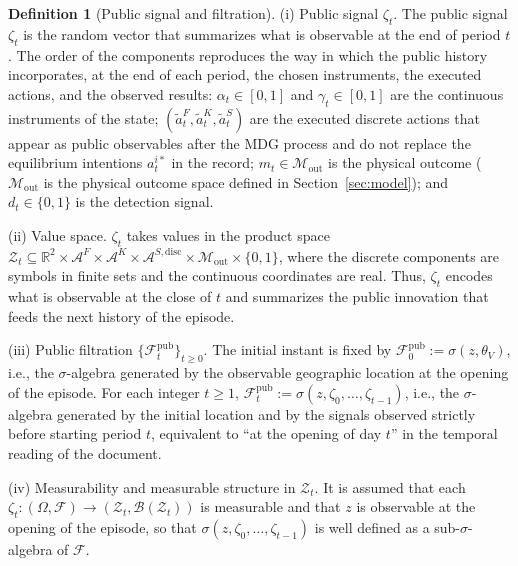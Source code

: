 \documentclass[pdflatex,sn-mathphys-ay]{sn-jnl}
\theoremstyle{plain}
\theoremstyle{definition}
\newtheorem{definition}[theorem]{Definition}
\newcommand{\1}{\mathbf{1}}
\begin{document}
\begin{definition}[Public signal and filtration]
\label{def:zeta-filtration}
\noindent\textup{(i)} Public signal $\zeta_t$.\quad
The public signal $\zeta_t$ is the random vector that summarizes what is observable at the end of period $t$. The order of the components reproduces the way in which the public history incorporates, at the end of each period, the chosen instruments, the executed actions, and the observed results:
 $\alpha_t\in[0,1]$ and $\gamma_t\in[0,1]$ are the continuous instruments of the state; $(\tilde{a}_t^F,\tilde{a}_t^K,\tilde{a}_t^S)$ are the executed discrete actions that appear as public observables after the MDG process and do not replace the equilibrium intentions $a_t^{i\ast}$ in the record; $m_t\in\mathcal{M}_{\mathrm{out}}$ is the physical outcome \textup{(}$\mathcal{M}_{\mathrm{out}}$ is the physical outcome space defined in Section~\ref{sec:model}\textup{)}; and $d_t\in\{0,1\}$ is the detection signal.

\medskip
\noindent\textup{(ii)} Value space.\quad
$\zeta_t$ takes values in the product space $\mathcal{Z}_t \subseteq \mathbb{R}^2 \times \mathcal{A}^F \times \mathcal{A}^K \times \mathcal{A}^{S,\mathrm{disc}} \times \mathcal{M}_{\mathrm{out}} \times \{0,1\}$, where the discrete components are symbols in finite sets and the continuous coordinates are real. Thus, $\zeta_t$ encodes what is observable at the close of $t$ and summarizes the public innovation that feeds the next history of the episode.

\medskip
\noindent\textup{(iii)} Public filtration $\{\mathcal{F}_t^{\mathrm{pub}}\}_{t\ge 0}$.\quad
The initial instant is fixed by $\mathcal{F}_0^{\mathrm{pub}}:=\sigma(z, \theta_V)$, i.e., the $\sigma$-algebra generated by the observable geographic location at the opening of the episode. For each integer $t\ge 1$, $\mathcal{F}_t^{\mathrm{pub}}:=\sigma(z,\zeta_0,\ldots,\zeta_{t-1})$, i.e., the $\sigma$-algebra generated by the initial location and by the signals observed strictly before starting period $t$, equivalent to ``at the opening of day $t$'' in the temporal reading of the document.

\smallskip
\noindent\textup{(iv)} Measurability and measurable structure in $\mathcal{Z}_t$.\quad
It is assumed that each $\zeta_t:(\Omega,\mathcal{F})\to(\mathcal{Z}_t,\mathcal{B}(\mathcal{Z}_t))$ is measurable and that $z$ is observable at the opening of the episode, so that $\sigma(z,\zeta_0,\ldots,\zeta_{t-1})$ is well defined as a sub-$\sigma$-algebra of $\mathcal{F}$.
\end{definition}
\end{document}
